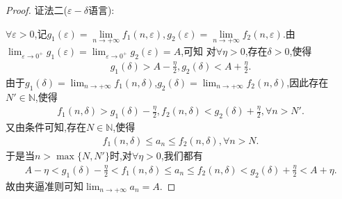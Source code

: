 \documentclass[../../main.tex]{subfiles}%
\begin{document}
\begin{proof}
{\color{blue}证法二($\varepsilon-\delta$语言):}

$\forall \varepsilon>0$,记$g_1\left( \varepsilon \right) =\underset{n\rightarrow +\infty}{\lim}f_1(n,\varepsilon ),g_2\left( \varepsilon \right) =\underset{n\rightarrow +\infty}{\lim}f_2(n,\varepsilon ).$由\(\lim_{\varepsilon \to 0^+}g_1(\varepsilon)=\lim_{\varepsilon \to 0^+}g_2(\varepsilon)=A\),可知
对\(\forall \eta > 0\),存在\(\delta > 0\),使得
\begin{align*}
g_1(\delta) > A - \frac{\eta}{2},g_2(\delta) < A + \frac{\eta}{2}.
\end{align*}
由于\(g_1(\delta)=\lim_{n \to +\infty}f_1(n,\delta)\),\(g_2(\delta)=\lim_{n \to +\infty}f_2(n,\delta)\),因此存在\(N'\in \mathbb{N}\),使得
\begin{align*}
f_1(n,\delta) > g_1(\delta) - \frac{\eta}{2},f_2(n,\delta) < g_2(\delta) + \frac{\eta}{2},\forall n > N'.
\end{align*}
又由条件可知,存在\(N\in \mathbb{N}\),使得
\begin{align*}
f_1(n,\delta) \leqslant a_n \leqslant f_2(n,\delta),\forall n > N .
\end{align*}
于是当\(n > \max\{N,N'\}\)时,对\(\forall \eta > 0\),我们都有
\begin{align*}
A - \eta < g_1(\delta) - \frac{\eta}{2} < f_1(n,\delta) \leqslant a_n \leqslant f_2(n,\delta) < g_2(\delta) + \frac{\eta}{2} < A + \eta.
\end{align*}
故由夹逼准则可知\(\lim_{n \to +\infty}a_n = A\). 
\end{proof}
\end{document}
